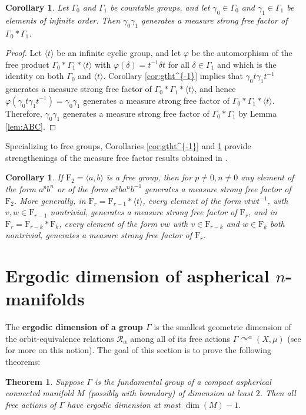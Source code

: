 \documentclass[11pt]{amsart}
\theoremstyle{definition}
\theoremstyle{plain}
\newtheorem{thm}[definition]{Theorem}
\newtheorem{corollary}[definition]{Corollary}
\newcommand{\<}{\langle}
\renewcommand{\>}{\rangle}
\newcommand{\actson}{\curvearrowright}
\newcommand{\F}{\bm{\mathrm{F}}}
\newcommand{\define}[1]{\textbf{#1}}
\newcommand{\pmp}{\text{p.m.p.}}
\newcommand\RR{\mathscr{R}}
\begin{document}
\begin{corollary}\label{cor:g0g1}
Let $\Gamma _0$ and $\Gamma _1$ be countable groups, and let $\gamma _0 \in \Gamma _0$ and $\gamma _1\in \Gamma _1$ be elements of infinite order. Then $\gamma _0\gamma _1$ generates a measure strong free factor of $\Gamma _0\ast \Gamma _1$.
\end{corollary}

\begin{proof}
Let $\langle t\rangle $ be an infinite cyclic group, and let $\varphi$ be the automorphism of the free product $\Gamma _0\ast \Gamma _1\ast \langle t\rangle$ with $\varphi (\delta )=t^{-1}\delta t$ for all $\delta \in \Gamma _1$ and which is the identity on both $\Gamma _0$ and $\langle t\rangle$. Corollary \ref{cor:gtht^{-1}} implies that $\gamma _0t\gamma _1t^{-1}$ generates a measure strong free factor of $\Gamma _0\ast \Gamma _1 \ast \langle t\rangle$, and hence $\varphi (\gamma _0t\gamma _1t^{-1}) = \gamma _0\gamma _1$ generates a measure strong free factor of $\Gamma _0\ast \Gamma _1\ast \langle t \rangle$. Therefore, $\gamma _0\gamma _1$ generates a measure strong free factor of $\Gamma _0\ast \Gamma _1$ by Lemma \ref{lem:ABC}.
\end{proof}

Specializing to free groups, Corollaries \ref{cor:gtht^{-1}} and \ref{cor:g0g1} provide strengthenings of the measure free factor results obtained in \cite{Alonso-2014}.

\begin{corollary}\label{cor:freegroupmsff}
If $\F_2=\langle a,b\rangle$ is a free group, then for $p\not=0, n\not=0$ any element of the form $a^p b^n$ or of the form $a^p b a^n b^{-1}$ generates a measure strong free factor of $\F _2$. More generally, in $\F_r=\F_{r-1}*\langle t\rangle$, every element of the form $vtwt^{-1}$, with $v,w \in \F _{r-1}$ nontrivial, generates a measure strong free factor of $\F _r$, and in $\F _r = \F _{r-k}*\F _k$, every element of the form $vw$ with $v\in \F _{r-k}$ and $w\in \F _k$ both nontrivial, generates a measure strong free factor of $\F _r$.
\end{corollary}


\section{\texorpdfstring{Ergodic dimension of aspherical $n$-manifolds}{Ergodic dimension of aspherical n-manifolds}}

The \define{ergodic dimension of a group $\Gamma$} \cite[D\'ef. 6.4]{Gab02} is the smallest geometric dimension of the orbit-equivalence relations $\RR_{\alpha}$ among all of its free \pmp{} actions  $\Gamma\actson ^{\alpha}(X,\mu)$ (see \cite{Gab-erg-dim} for more on this notion).
The goal of this section is to prove the following theorems:
\begin{thm}\label{erg dim d-mfld}
  Suppose $\Gamma $ is the fundamental group of a compact aspherical connected manifold
  $M$ (possibly with boundary) of
  dimension at least $2$. Then all free \pmp{} actions of $\Gamma$ have
  ergodic dimension at most $\dim(M) - 1$.
\end{thm}
\end{document}
